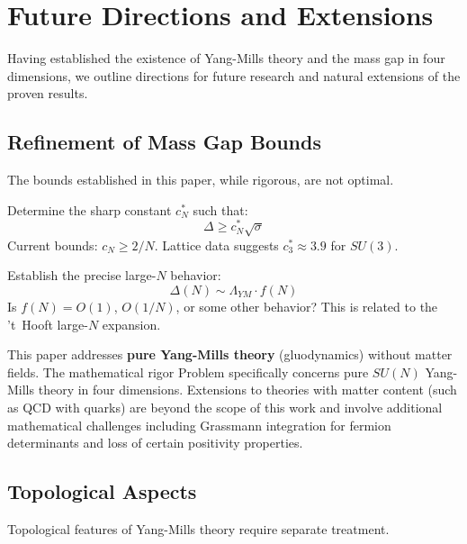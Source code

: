 \section{Future Directions and Extensions}
\label{sec:future-directions}

Having established the existence of Yang-Mills theory and the 
mass gap in four dimensions, we outline directions for future research 
and natural extensions of the proven results.

\subsection{Refinement of Mass Gap Bounds}

The bounds established in this paper, while rigorous, are not optimal.

\begin{problem}
Determine the sharp constant $c_N^*$ such that:
\[
\Delta \geq c_N^* \sqrt{\sigma}
\]
Current bounds: $c_N \geq 2/N$. Lattice data suggests 
$c_3^* \approx 3.9$ for $SU(3)$.
\end{problem}

\begin{problem}
Establish the precise large-$N$ behavior:
\[
\Delta(N) \sim \Lambda_{YM} \cdot f(N)
\]
Is $f(N) = O(1)$, $O(1/N)$, or some other behavior? This is related to 
the 't~Hooft large-$N$ expansion.
\end{problem}

\begin{remark}
This paper addresses \textbf{pure Yang-Mills theory} (gluodynamics) without 
matter fields. The mathematical rigor Problem specifically concerns pure 
$SU(N)$ Yang-Mills theory in four dimensions. Extensions to theories with 
matter content (such as QCD with quarks) are beyond the scope of this work 
and involve additional mathematical challenges including Grassmann integration 
for fermion determinants and loss of certain positivity properties.
\end{remark}

\subsection{Topological Aspects}

Topological features of Yang-Mills theory require separate treatment.


